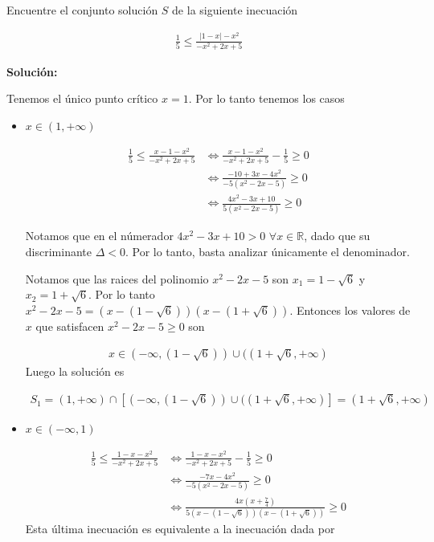 \documentclass[12pt]{book}
\begin{document}
\begin{prob}{}{}
    Encuentre el conjunto solución $S$ de la siguiente inecuación

    \begin{align*}
        \frac{1}{5}\leq \frac{|1-x|-x^2}{-x^2+2x+5}
    \end{align*}
\end{prob}
\textbf{Solución:}

Tenemos el único punto crítico $x=1$. Por lo tanto tenemos los casos

\begin{itemize}
    \item $x \in (1,+\infty)$

\begin{align*}
    \frac{1}{5}\leq \frac{x-1-x^2}{-x^2+2x+5} &\Longleftrightarrow \frac{x-1-x^2}{-x^2+2x+5}-\frac{1}{5}\geq 0 \\
     &\Longleftrightarrow \frac{-10+3x-4x^2}{-5(x^2-2x-5)}\geq 0 \\
   &\Longleftrightarrow \frac{4x^2-3x+10}{5(x^2-2x-5)}\geq 0 
\end{align*}

Notamos que en el númerador $4x^2-3x +10 >0$ $ \forall x \in \mathbb{R}$, dado que su discriminante $\Delta <0$. Por lo tanto, basta analizar únicamente el denominador.

Notamos que las raices del polinomio $x^2-2x-5$ son $x_1=1-\sqrt{6}$ y $x_2=1+\sqrt{6}$. Por lo tanto  $x^2-2x-5=(x-(1-\sqrt{6}))(x-(1+\sqrt{6}))$. Entonces los valores de $x$ que satisfacen $x^2-2x-5\geq 0$ son 

\begin{align*}
    x \in (-\infty,(1-\sqrt{6})) \cup ((1+\sqrt{6}, +\infty)
\end{align*}
Luego la solución es 

\begin{align*}
    S_1=(1,+\infty) \cap \left[(-\infty,(1-\sqrt{6})) \cup ((1+\sqrt{6}, +\infty)\right]=(1+\sqrt{6}, +\infty)
\end{align*}


\item $x \in (-\infty, 1)$

\begin{align*}
    \frac{1}{5}\leq \frac{1-x-x^2}{-x^2+2x+5}  &\Longleftrightarrow \frac{1-x-x^2}{-x^2+2x+5}-\frac{1}{5} \geq 0\\
   &\Longleftrightarrow\frac{-7x-4x^2}{-5(x^2-2x-5)} \geq 0 \\
    &\Longleftrightarrow \frac{4x(x+\frac{7}{4})}{5(x-(1-\sqrt{6}))(x-(1+\sqrt{6}))} \geq 0
\end{align*}
Esta última inecuación es equivalente a la inecuación dada por 


\end{itemize}
\end{document}
